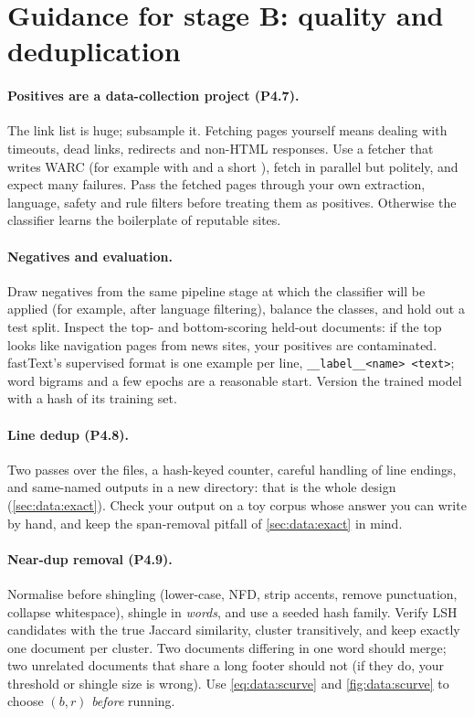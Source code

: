 \section{Guidance for stage B: quality and deduplication}\label{sec:proj4:part2}

\paragraph{Positives are a data-collection project (P4.7).} The link list is huge; subsample it.
Fetching pages yourself means dealing with timeouts, dead links, redirects and non-HTML responses.
Use a fetcher that writes WARC (for example  with  and a short
), fetch in parallel but politely, and expect many failures. Pass the fetched pages
through your own extraction, language, safety and rule filters before treating them as positives.
Otherwise the classifier learns the boilerplate of reputable sites.

\paragraph{Negatives and evaluation.} Draw negatives from the same pipeline stage at which the
classifier will be applied (for example, after language filtering), balance the classes, and hold
out a test split. Inspect the top- and bottom-scoring held-out documents: if the top looks like
navigation pages from news sites, your positives are contaminated. fastText's supervised format is
one example per line, \texttt{\_\_label\_\_<name> <text>}; word bigrams and a few epochs are a
reasonable start. Version the trained model with a hash of its training set.

\paragraph{Line dedup (P4.8).} Two passes over the files, a hash-keyed counter, careful handling of
line endings, and same-named outputs in a new directory: that is the whole design
(\cref{sec:data:exact}). Check your output on a toy corpus whose answer you can write by hand, and
keep the span-removal pitfall of \cref{sec:data:exact} in mind.

\paragraph{Near-dup removal (P4.9).} Normalise before shingling (lower-case, NFD, strip accents,
remove punctuation, collapse whitespace), shingle in \emph{words}, and use a seeded hash family. Verify LSH
candidates with the true Jaccard similarity, cluster transitively, and keep exactly one document per
cluster. Two documents differing in one word should merge; two unrelated documents that share a long
footer should not (if they do, your threshold or shingle size is wrong). Use \cref{eq:data:scurve} and
\cref{fig:data:scurve} to choose $(b,r)$ \emph{before} running.

